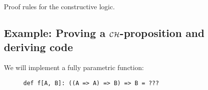 \begin{table}
\begin{centering}
{\small{}}%
\par\end{centering}
\caption{Proof rules for the constructive logic.\label{tab:Proof-rules-for-constructive-logic}}
\end{table}


\subsection{Example: Proving a ${\cal CH}$-proposition and deriving code\label{subsec:Example:-Proving-a-ch-proposition}}

We will implement a fully parametric function:

\begin{wrapfigure}{l}{0.45\columnwidth}%
\vspace{-0.75\baselineskip}
\begin{lstlisting}
def f[A, B]: ((A => A) => B) => B = ???
\end{lstlisting}

\vspace{-0.9\baselineskip}
\end{wrapfigure}%

